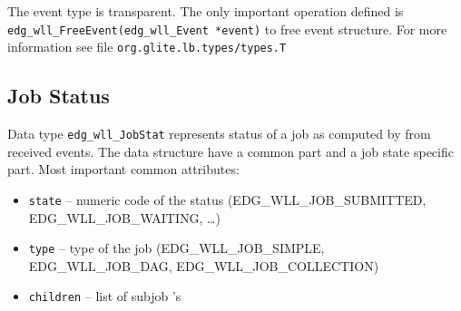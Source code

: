 The event type is transparent. The only important operation defined is
\texttt{edg\_wll\_FreeEvent(edg\_wll\_Event *event)} to free event
structure. For more information see file \texttt{org.glite.lb.types/types.T} 


\subsection{Job Status}
Data type \texttt{edg\_wll\_JobStat} represents status of a job as
computed by \LB from received events. The data structure have a common
part and a job state specific part. Most important common
attributes:
\begin{itemize}
  \item \texttt{state} -- numeric code of the status
    (EDG\_WLL\_JOB\_SUBMITTED, EDG\_WLL\_JOB\_WAITING, \dots)
  \item \texttt{type} -- type of the job (EDG\_WLL\_JOB\_SIMPLE,
    EDG\_WLL\_JOB\_DAG, EDG\_WLL\_JOB\_COLLECTION) 
  \item \texttt{children} -- list of subjob \jobid's
\end{itemize}



